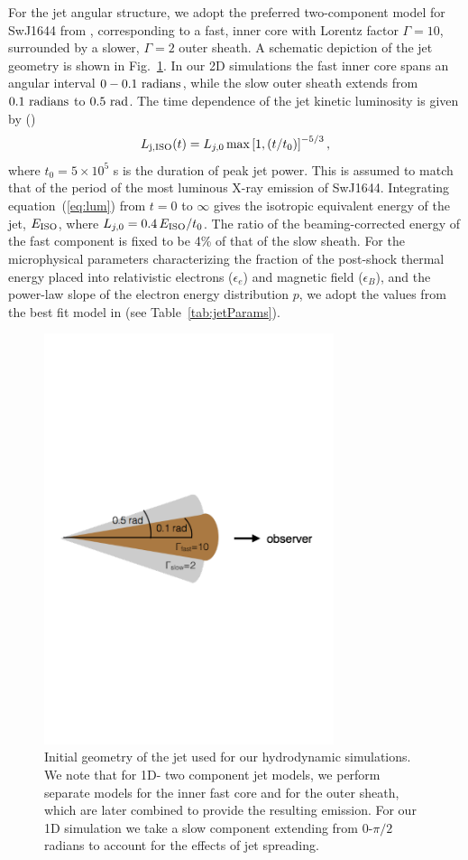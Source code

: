 \documentclass[usenatbib,fleqn]{mnras}
\begin{document}
For the jet angular structure, we adopt the preferred two-component
model for SwJ1644 from \citet{Mimica+2015}, corresponding to a fast,
inner core with Lorentz factor $\Gamma = 10$, surrounded by a slower,
$\Gamma=2$ outer sheath. A schematic depiction of the jet geometry is
shown in Fig.~\ref{fig:jetstruct}.  In our 2D simulations the fast
inner core spans an angular interval $0-0.1\ {\rm radians}$, while the
slow outer sheath extends from $0.1\ {\rm radians}$ to $0.5\ {\rm
  rad}$.  The time dependence of the jet kinetic luminosity is given
by (\citealt{Mimica+2015})
\begin{equation}\label{eq:lum}
L_{\rm j, ISO}(t) = L_{j,0}\max\left[1, (t/t_0)\right]^{-5/3},
\end{equation}
where $t_0 = 5\times 10^5$ s is the duration of peak jet power. This
is assumed to match that of the period of the most luminous X-ray
emission of SwJ1644.  Integrating equation~(\ref{eq:lum}) from $t = 0$
to $\infty$ gives the isotropic equivalent energy of the jet, $E_{\rm
  ISO}$, where $L_{j,0}=0.4\, E_{\rm ISO}/t_0$.  The ratio of the
beaming-corrected energy of the fast component is fixed to be 4\% of
that of the slow sheath. For the microphysical parameters
characterizing the fraction of the post-shock thermal energy placed
into relativistic electrons ($\epsilon_e$) and magnetic field
($\epsilon_B$), and the power-law slope of the electron energy
distribution $p$, we adopt the values from the best fit model in
\citet{Mimica+2015} (see Table~\ref{tab:jetParams}).

\begin{figure}

\includegraphics[width=8.5cm]{jetstruct.pdf}
\caption{\label{fig:jetstruct} Initial geometry of the jet used for
  our hydrodynamic simulations. We note that for 1D- two component jet
  models, we perform separate models for the inner fast core and for
  the outer sheath, which are later combined to provide the resulting
  emission. For our 1D simulation we take a slow component
  extending from 0-$\pi/2$ radians to account for the effects of jet
  spreading.}
\end{figure}
\end{document}
